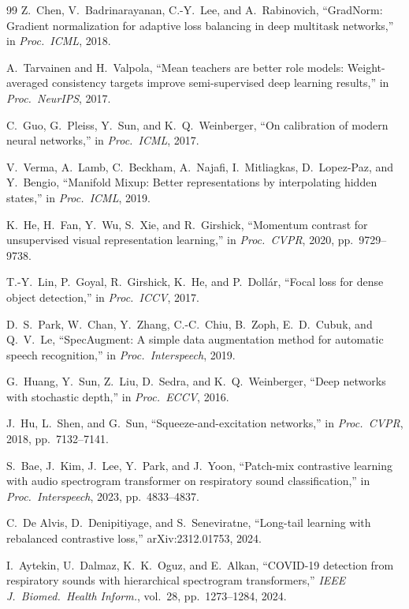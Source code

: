\documentclass[journal]{IEEEtran}
\begin{document}
\begin{thebibliography}{99}
Z.~Chen, V.~Badrinarayanan, C.-Y.~Lee, and A.~Rabinovich,
``GradNorm: Gradient normalization for adaptive loss balancing in deep
multitask networks,'' in \emph{Proc.\ ICML}, 2018.

A.~Tarvainen and H.~Valpola,
``Mean teachers are better role models: Weight-averaged consistency
targets improve semi-supervised deep learning results,''
in \emph{Proc.\ NeurIPS}, 2017.

C.~Guo, G.~Pleiss, Y.~Sun, and K.~Q.~Weinberger,
``On calibration of modern neural networks,''
in \emph{Proc.\ ICML}, 2017.

V.~Verma, A.~Lamb, C.~Beckham, A.~Najafi, I.~Mitliagkas, D.~Lopez-Paz,
and Y.~Bengio,
``Manifold Mixup: Better representations by interpolating hidden states,''
in \emph{Proc.\ ICML}, 2019.

K.~He, H.~Fan, Y.~Wu, S.~Xie, and R.~Girshick,
``Momentum contrast for unsupervised visual representation learning,''
in \emph{Proc.\ CVPR}, 2020, pp.~9729--9738.

T.-Y.~Lin, P.~Goyal, R.~Girshick, K.~He, and P.~Doll{\'a}r,
``Focal loss for dense object detection,''
in \emph{Proc.\ ICCV}, 2017.

D.~S.~Park, W.~Chan, Y.~Zhang, C.-C.~Chiu, B.~Zoph, E.~D.~Cubuk,
and Q.~V.~Le,
``SpecAugment: A simple data augmentation method for automatic speech recognition,''
in \emph{Proc.\ Interspeech}, 2019.

G.~Huang, Y.~Sun, Z.~Liu, D.~Sedra, and K.~Q.~Weinberger,
``Deep networks with stochastic depth,''
in \emph{Proc.\ ECCV}, 2016.

J.~Hu, L.~Shen, and G.~Sun,
``Squeeze-and-excitation networks,''
in \emph{Proc.\ CVPR}, 2018, pp.~7132--7141.

S.~Bae, J.~Kim, J.~Lee, Y.~Park, and J.~Yoon,
``Patch-mix contrastive learning with audio spectrogram transformer on
respiratory sound classification,''
in \emph{Proc.\ Interspeech}, 2023, pp.~4833--4837.

C.~De Alvis, D.~Denipitiyage, and S.~Seneviratne,
``Long-tail learning with rebalanced contrastive loss,''
arXiv:2312.01753, 2024.

I.~Aytekin, U.~Dalmaz, K.~K.~Oguz, and E.~Alkan,
``COVID-19 detection from respiratory sounds with hierarchical spectrogram
transformers,''
\emph{IEEE J.\ Biomed.\ Health Inform.}, vol.~28, pp.~1273--1284, 2024.


\end{thebibliography}
\end{document}
